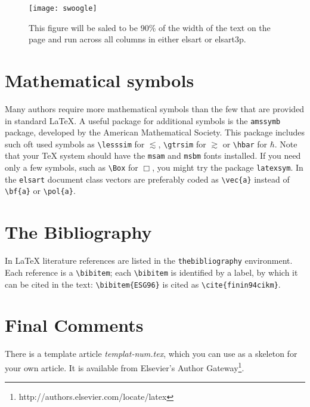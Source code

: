 \documentclass{elsart3p}    %
\begin{document}
\begin{figure*}


\centering \texttt{[image: swoogle]}


\caption{This figure will be saled to be 90\% of the width of the
text on the page and run across all columns in either elsart or
elsart3p.}

\label{fig:exmp2}
\end{figure*}


\section{Mathematical symbols}
\label{symbols}

Many authors require more mathematical symbols than the few that
are provided in standard \LaTeX. A useful package for additional
symbols is the \texttt{amssymb} package, developed by the
American Mathematical Society.  This package includes such oft
used symbols as \verb|\lesssim| for $\lesssim$, \verb|\gtrsim|
for $\gtrsim$ or \verb|\hbar| for $\hbar$.  Note that your \TeX{}
system should have the \texttt{msam} and \texttt{msbm} fonts
installed.  If you need only a few symbols, such as \verb|\Box|
for $\Box$, you might try the package \texttt{latexsym}.  In the
\texttt{elsart} document class vectors are preferably coded as
\verb|\vec{a}| instead of \verb|\bf{a}| or \verb|\pol{a}|.

\section{The Bibliography}
\label{thebib}

In \LaTeX{} literature references are listed in the
\verb|thebibliography| environment. Each reference is a
\verb|\bibitem|; each \verb|\bibitem| is identified by a label,
by which it can be cited in the text: \verb|\bibitem{ESG96}| is
cited as \verb|\cite{finin94cikm}|.

\section{Final Comments} 
\label{comments}

There is a template article {\em templat-num.tex}, which you can use as a
skeleton for your own article. It is available from Elsevier's Author
Gateway\footnote{http://authors.elsevier.com/locate/latex}.

\nocite{nardi2003,finin94cikm}




\end{document}
